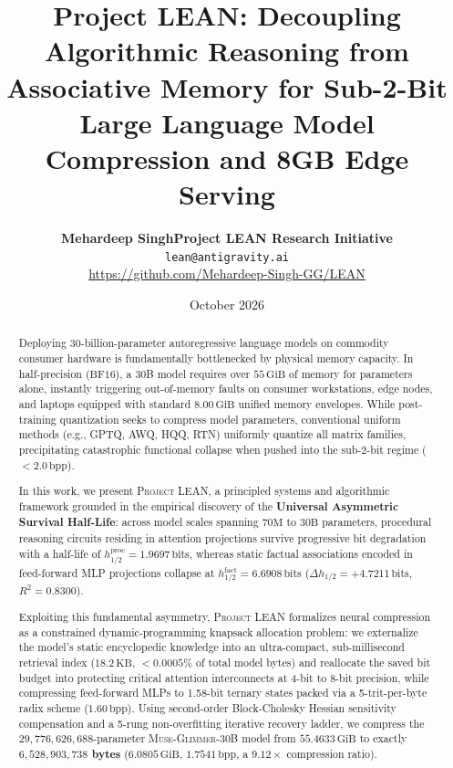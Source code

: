 \documentclass[10pt,twocolumn,letterpaper]{article}
\newcommand{\modelname}{\textsc{Muse-Glimmer-30B}}
\newcommand{\systemname}{\textsc{Project LEAN}}
\begin{document}
\title{\textbf{Project LEAN: Decoupling Algorithmic Reasoning from Associative Memory for Sub-2-Bit Large Language Model Compression and 8GB Edge Serving}}

\author{
\textbf{Mehardeep Singh}\quad \textbf{Project LEAN Research Initiative}\\
\texttt{lean@antigravity.ai}\\
\url{https://github.com/Mehardeep-Singh-GG/LEAN}
}

\date{October 2026}

\maketitle

\begin{abstract}
Deploying 30-billion-parameter autoregressive language models on commodity consumer hardware is fundamentally bottlenecked by physical memory capacity. In half-precision ($\text{BF16}$), a 30B model requires over $55\,\text{GiB}$ of memory for parameters alone, instantly triggering out-of-memory faults on consumer workstations, edge nodes, and laptops equipped with standard $8.00\,\text{GiB}$ unified memory envelopes. While post-training quantization seeks to compress model parameters, conventional uniform methods (e.g., GPTQ, AWQ, HQQ, RTN) uniformly quantize all matrix families, precipitating catastrophic functional collapse when pushed into the sub-2-bit regime ($<2.0\,\text{bpp}$). 

In this work, we present \systemname{}, a principled systems and algorithmic framework grounded in the empirical discovery of the \textbf{Universal Asymmetric Survival Half-Life}: across model scales spanning $70\text{M}$ to $30\text{B}$ parameters, procedural reasoning circuits residing in attention projections survive progressive bit degradation with a half-life of $h_{1/2}^{\text{proc}} = 1.9697\,\text{bits}$, whereas static factual associations encoded in feed-forward MLP projections collapse at $h_{1/2}^{\text{fact}} = 6.6908\,\text{bits}$ ($\Delta h_{1/2} = +4.7211\,\text{bits}$, $R^2 = 0.8300$). 

Exploiting this fundamental asymmetry, \systemname{} formalizes neural compression as a constrained dynamic-programming knapsack allocation problem: we externalize the model's static encyclopedic knowledge into an ultra-compact, sub-millisecond retrieval index ($18.2\,\text{KB}$, $<0.0005\%$ of total model bytes) and reallocate the saved bit budget into protecting critical attention interconnects at 4-bit to 8-bit precision, while compressing feed-forward MLPs to 1.58-bit ternary states packed via a 5-trit-per-byte radix scheme ($1.60\,\text{bpp}$). Using second-order Block-Cholesky Hessian sensitivity compensation and a 5-rung non-overfitting iterative recovery ladder, we compress the $29,776,626,688$-parameter \modelname{} model from $55.4633\,\text{GiB}$ to exactly \textbf{$6,528,903,738$ bytes} ($6.0805\,\text{GiB}$, $1.7541\,\text{bpp}$, a \textbf{$9.12\times$} compression ratio). 


\end{abstract}
\end{document}
